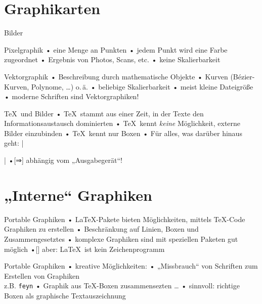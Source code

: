 

\usepackage{
  blindtext,
  boxedminipage,
  ecltree,
  epic,
  eepic,
  fancybox,
  shadow,
  subfloat,
  wrapfig
}
\usepackage{bar}
\let\barbar\bar
\let\bar\relax


\let\bar\barbar
\section{Graphikarten}
\begin{frame}{Bilder}
\begin{block}{Pixelgraphik}
• eine Menge an Punkten
• jedem Punkt wird eine Farbe zugeordnet
• Ergebnis von Photos, Scans, etc. 
• keine Skalierbarkeit
\•
\end{block}

\begin{block}{Vektorgraphik}
• Beschreibung durch mathematische Objekte
• Kurven (Bézier-Kurven, Polynome, …) o.\,ä.
• beliebige Skalierbarkeit
• meist kleine Dateigröße
• moderne Schriften sind Vektorgraphiken!
\•
\end{block}
\end{frame}

\begin{frame}[fragile]{\TeX\ und Bilder}
• \TeX\ stammt aus einer Zeit, in der Texte den Informationsaustausch dominierten
• \TeX\ kennt \emph{keine} Möglichkeit, externe Bilder einzubinden
• \TeX\ kennt nur Boxen
• Für alles, was darüber hinaus geht: |\special|
•[⇒] abhängig vom „Ausgabegerät“!
\•
\end{frame}

\section[Internes]{„Interne“ Graphiken}
\begin{frame}[fragile]{Portable Graphiken}
• \LaTeX-Pakete bieten Möglichkeiten, mittels \TeX-Code Graphiken zu erstellen
• Beschränkung auf Linien, Boxen und Zusammengesetztes
• komplexe Graphiken sind mit speziellen Paketen gut möglich
•[] aber: \alert{\LaTeX\ ist kein Zeichenprogramm}
\•
\end{frame}

\begin{frame}{Portable Graphiken}
• kreative Möglichkeiten:
• „Missbrauch“ von Schriften zum Erstellen von Graphiken\\%
z.B. \texttt{feyn}
• Graphik aus \TeX-Boxen zusammensezten \dots
\pause
• sinnvoll: richtige Boxen als graphische Textauszeichnung
\•
\end{frame}

